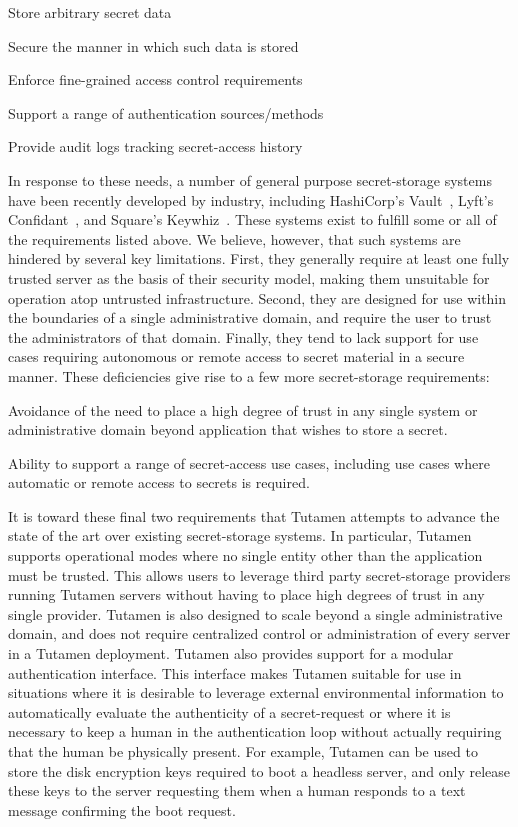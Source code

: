 \begin{packed_item}
\item Store arbitrary secret data
\item Secure the manner in which such data is stored
\item Enforce fine-grained access control requirements
\item Support a range of authentication sources/methods
\item Provide audit logs tracking secret-access history
\end{packed_item}

In response to these needs, a number of general purpose secret-storage
systems have been recently developed by industry, including
HashiCorp's Vault~\cite{vault}, Lyft's Confidant~\cite{confidant}, and
Square's Keywhiz~\cite{keywhiz}. These systems exist to fulfill some
or all of the requirements listed above. We believe, however, that
such systems are hindered by several key limitations. First, they
generally require at least one fully trusted server as the basis of
their security model, making them unsuitable for operation atop
untrusted infrastructure. Second, they are designed for use within the
boundaries of a single administrative domain, and require the user to
trust the administrators of that domain. Finally, they tend to lack
support for use cases requiring autonomous or remote access to secret
material in a secure manner. These deficiencies give rise to a few
more secret-storage requirements:

\begin{packed_item}
\item Avoidance of the need to place a high degree of trust in any
  single system or administrative domain beyond application that
  wishes to store a secret.
\item Ability to support a range of secret-access use cases, including
  use cases where automatic or remote access to secrets is required.
\end{packed_item}

It is toward these final two requirements that Tutamen attempts to
advance the state of the art over existing secret-storage systems. In
particular, Tutamen supports operational modes where no single entity
other than the application must be trusted. This allows users to
leverage third party secret-storage providers running Tutamen servers
without having to place high degrees of trust in any single
provider. Tutamen is also designed to scale beyond a single
administrative domain, and does not require centralized control or
administration of every server in a Tutamen deployment. Tutamen also
provides support for a modular authentication interface. This
interface makes Tutamen suitable for use in situations where it is
desirable to leverage external environmental information to
automatically evaluate the authenticity of a secret-request or where
it is necessary to keep a human in the authentication loop without
actually requiring that the human be physically present. For example,
Tutamen can be used to store the disk encryption keys required to boot
a headless server, and only release these keys to the server
requesting them when a human responds to a text message confirming the
boot request.

